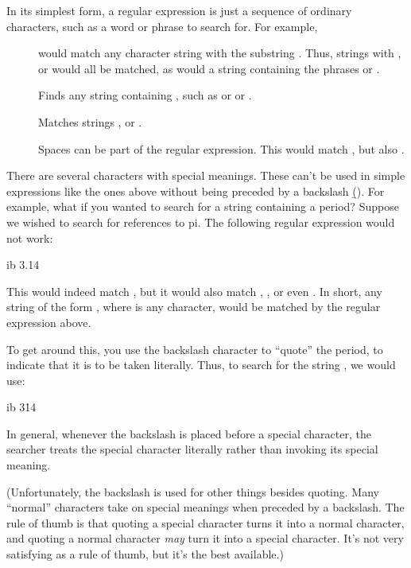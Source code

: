 \documentclass{dods-book}
\begin{document}
In its simplest form, a regular expression is just a sequence of
ordinary characters, such as a word or phrase to search for.  For
example,

\begin{description}
\item[] would match any character string with the substring
  .  Thus, strings with ,  or
   would all be matched, as would a string containing the
  phrases  or .
\item[] Finds any string containing , such as
   or  or .
\item[] Matches strings ,  or
  .
\item[] Spaces can be part of the regular expression.
  This would match , but also .
\end{description}

There are several characters with special meanings.  These can't be
used in simple expressions like the ones above without being preceded
by a backslash (\b{}).  For example, what if you wanted to search for
a string containing a period?  Suppose we wished to search for
references to pi.  The following regular expression would not work:

\begin{vcode}{ib}
3.14  
\end{vcode}

This would indeed match , but it would also match
, , or even .  In short, any string of
the form , where  is any character, would be matched
by the regular expression above.

To get around this, you use the backslash character to ``quote'' the
period, to indicate that it is to be taken literally.  Thus, to search
for the string , we would use:

\begin{vcode}{ib}
3\.14
\end{vcode}

In general, whenever the backslash is placed before a special character,
the searcher treats the special character literally rather than invoking
its special meaning.

(Unfortunately, the backslash is used for other things besides
quoting.  Many ``normal'' characters take on special meanings when
preceded by a backslash.  The rule of thumb is that quoting a special
character turns it into a normal character, and quoting a normal
character \emph{may} turn it into a special character.  It's not very
satisfying as a rule of thumb, but it's the best available.)
\end{document}
